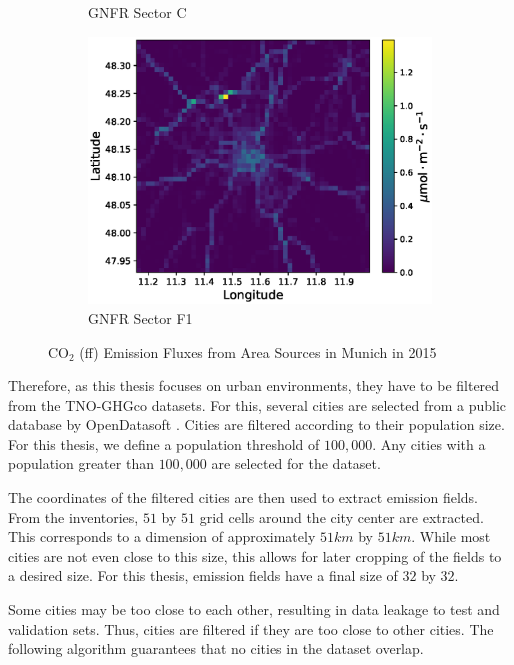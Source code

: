 \begin{figure}
\begin{subfigure}{0.32\textwidth}
        \caption{GNFR Sector C}
    \end{subfigure}
    \begin{subfigure}{0.32\textwidth}
        \centering
        \includegraphics[width=\linewidth]{figures/03_dataset/munich/munich_2015_sector_f1.eps}
        \caption{GNFR Sector F1}
    \end{subfigure}
    \caption{$\text{CO}_2$ (ff) Emission Fluxes from Area Sources in Munich in 2015 \parencite{TNO_HighRes15}}
    \label{fig:munich_emissions}
\end{figure}
Therefore, as this thesis focuses on urban environments, they have to be filtered from the TNO-GHGco datasets.
For this, several cities are selected from a public database by OpenDatasoft \parencite{OpenDataSoft}.
Cities are filtered according to their population size.
For this thesis, we define a population threshold of $100,000$.
Any cities with a population greater than $100,000$ are selected for the dataset.

The coordinates of the filtered cities are then used to extract emission fields.
From the inventories, $51$ by $51$ grid cells around the city center are extracted.
This corresponds to a dimension of approximately $51 \unit{km}$ by $51 \unit{km}$. 
While most cities are not even close to this size, this allows for later cropping of the fields to a desired size.
For this thesis, emission fields have a final size of $32$ by $32$.

Some cities may be too close to each other, resulting in data leakage to test and validation sets.
Thus, cities are filtered if they are too close to other cities.
The following algorithm guarantees that no cities in the dataset overlap.

